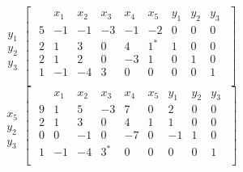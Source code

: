 \documentclass[12pt]{article}
\newenvironment{problem}[2][Problem]{\begin{trivlist}
\item[\hskip \labelsep {\bfseries #1}\hskip \labelsep {\bfseries #2.}]}{\end{trivlist}}
\theoremstyle{definition}
\begin{document}
\begin{problem}{4}
\begin{equation}
\begin{array}{c}
\\
  \\
y_1 \\
y_2 \\
y_3
\end{array}
\begin{bmatrix}
\begin{array}{c|cccccccc}
    & x_1 & x_2 & x_3 & x_4 & x_5 & y_1 & y_2 & y_3 \\ \hline
  5 & -1 & -1 & -3 & -1 & -2 & 0 & 0 & 0 \\ \hline
  2 & 1 & 3 & 0 & 4 & 1^* & 1 & 0 & 0  \\
  2 & 1 & 2 & 0 & -3 & 1 & 0 & 1 & 0  \\
  1 & -1 & -4 & 3 & 0 & 0 & 0 & 0 & 1  \\
\end{array}
\end{bmatrix}
\end{equation}
$ $ \\

\begin{equation}
\begin{array}{c}
\\
  \\
x_5 \\
y_2 \\
y_3
\end{array}
\begin{bmatrix}
\begin{array}{c|cccccccc}
    & x_1 & x_2 & x_3 & x_4 & x_5 & y_1 & y_2 & y_3 \\ \hline
  9 & 1 & 5 & -3 & 7 & 0 & 2 & 0 & 0 \\ \hline
  2 & 1 & 3 & 0 & 4 & 1 & 1 & 0 & 0  \\
  0 & 0 & -1 & 0 & -7 & 0 & -1 & 1 & 0  \\
  1 & -1 & -4 & 3^* & 0 & 0 & 0 & 0 & 1  \\
\end{array}
\end{bmatrix}
\end{equation}
$ $ \\


\end{problem}
\end{document}
